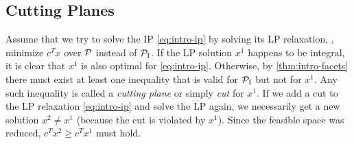 \subsection{Cutting Planes}\label{sec:intro-cuttingplanes}
Assume that we try to solve the IP \cref{eq:intro-ip} by solving its LP relaxation, \ie, minimize $c^Tx$ over $\P$ instead of $\PI$. If the LP solution $x^1$ happens to be integral, it is clear that $x^1$ is also optimal for \cref{eq:intro-ip}. Otherwise, by \cref{thm:intro-facets} there must exist at least one inequality that is valid for $\PI$ but not for $x^1$. Any such inequality is called a \emph{cutting plane} or simply \emph{cut} for $x^1$. If we add a cut to the LP relaxation \cref{eq:intro-ip} and solve the LP again, we necessarily get a new solution $x^2 ≠ x^1$ (because the cut is violated by $x^1$). Since the feasible space was reduced, $c^Tx^2 ≥ c^Tx^1$ must hold. 

